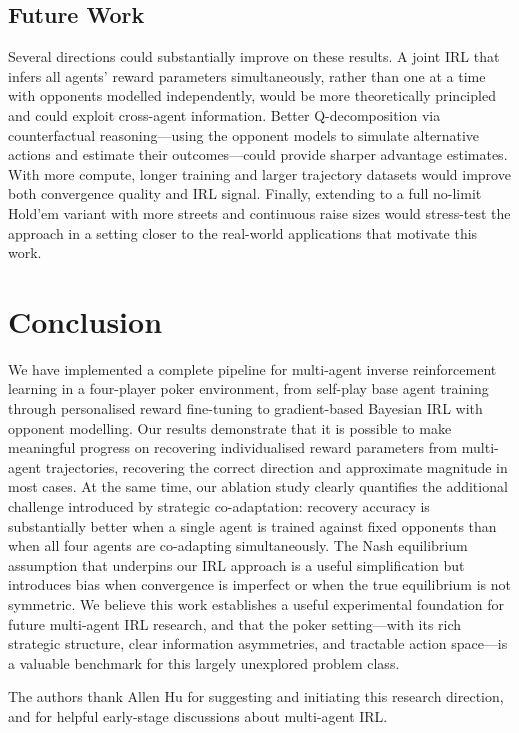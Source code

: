 \documentclass{article}
\begin{document}
\subsection{Future Work}

Several directions could substantially improve on these results. A joint IRL that infers all agents' reward parameters simultaneously, rather than one at a time with opponents modelled independently, would be more theoretically principled and could exploit cross-agent information. Better Q-decomposition via counterfactual reasoning---using the opponent models to simulate alternative actions and estimate their outcomes---could provide sharper advantage estimates. With more compute, longer training and larger trajectory datasets would improve both convergence quality and IRL signal. Finally, extending to a full no-limit Hold'em variant with more streets and continuous raise sizes would stress-test the approach in a setting closer to the real-world applications that motivate this work.

\section{Conclusion}

We have implemented a complete pipeline for multi-agent inverse reinforcement learning in a four-player poker environment, from self-play base agent training through personalised reward fine-tuning to gradient-based Bayesian IRL with opponent modelling. Our results demonstrate that it is possible to make meaningful progress on recovering individualised reward parameters from multi-agent trajectories, recovering the correct direction and approximate magnitude in most cases. At the same time, our ablation study clearly quantifies the additional challenge introduced by strategic co-adaptation: recovery accuracy is substantially better when a single agent is trained against fixed opponents than when all four agents are co-adapting simultaneously. The Nash equilibrium assumption that underpins our IRL approach is a useful simplification but introduces bias when convergence is imperfect or when the true equilibrium is not symmetric. We believe this work establishes a useful experimental foundation for future multi-agent IRL research, and that the poker setting---with its rich strategic structure, clear information asymmetries, and tractable action space---is a valuable benchmark for this largely unexplored problem class.

\begin{ack}
The authors thank Allen Hu for suggesting and initiating this research direction, and for helpful early-stage discussions about multi-agent IRL.
\end{ack}
\end{document}
